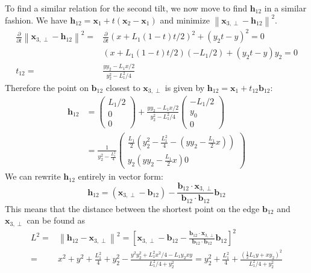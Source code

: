 \documentclass[10pt,a4paper]{article}
\newcommand{\half}[0]{\frac{1}{2}}
\newcommand{\bvec}[1]{\mathbf{#1}}
\begin{document}
To find a similar relation for the second tilt, we now move to find $\bvec{h}_{12}$ in a similar fashion.
We have $\bvec{h}_{12} = \bvec{x}_1 + t(\bvec{x}_2 - \bvec{x}_1)$ and minimize $\left\| \bvec{x}_{3,\perp} - \bvec{h}_{12} \right\|^2.$
\begin{align*}
  \frac{\partial}{\partial t}\left\| \bvec{x}_{3,\perp} - \bvec{h}_{12} \right\|^2 =& \frac{\partial}{\partial t}( x + L_1 (1-t)t / 2 )^2 + (y_2 t - y)^2 = 0  \\
                                                                                    &( x + L_1 (1-t)t / 2 )(-L_1/2) + (y_2 t - y)y_2 = 0 \\
  t_{12} =& \frac{ y y_2 - L_1x/2}{y_2^2 - L_1^2/4}
\end{align*}
Therefore the point on $\bvec{b}_{12}$ closest to $\bvec{x}_{3,\perp}$ is given by $\bvec{h}_{12} = \bvec{x}_1 + t_{12} \bvec{b}_{12}:$
\begin{align*}
  \bvec{h}_{12} &= \begin{pmatrix}
    L_1/2 \\
    0 \\
    0
  \end{pmatrix} + \frac{y y_2 - L_1 x / 2}{y_2^2 - L_1^2/4}\begin{pmatrix}
    -L_1/2\\
    y_0 \\
    0
  \end{pmatrix} \\
  &= \frac{1}{y_2^2 - \frac{L_1^2}{4} } \begin{pmatrix}
    \frac{L_1}{2}\left( y_2^2 - \frac{L_1^2}{4} - \left(y y_2 - \frac{L_1}{2}x\right) \right) \\
    y_2 \left( y y_2 - \frac{L_1}{2}x \right)
    0
  \end{pmatrix}
\end{align*}
We can rewrite $\bvec{h}_{12}$ entirely in vector form:
\begin{equation*}
  \bvec{h}_{12} = (\bvec{x}_{3,\perp} - \bvec{b}_{12}) - \frac{\bvec{b}_{12} \cdot \bvec{x}_{3,\perp}}{\bvec{b}_{12}\cdot \bvec{b}_{12}} \bvec{b}_{12} 
\end{equation*}
This means that the distance between the shortest point on the edge $\bvec{b}_{12}$ and $\bvec{x}_{3,\perp}$ can be found as
\begin{align*}
  L^2 =& \left\| \bvec{h}_{12} - \bvec{x}_{3,\perp} \right\|^2 = \left[ \bvec{x}_{3,\perp} - \bvec{b}_{12} - \frac{\bvec{b}_{12}\cdot \bvec{x}_{3,\perp}}{\bvec{b}_{12} \cdot \bvec{b}_{12}}\bvec{b}_{12} \right]^2 \\
  =& x^2 + y^2 + \frac{L_1^2}{4} + y_2^2 - \frac{y^2 y_2^2 + L_1^2x^2/4 - L_1y_2 x y}{L_1^2/4 + y_2^2} = y_2^2 + \frac{L_1^2}{4} + \frac{(\half L_1 y + x y_2)^2}{L_1^2/4 + y_2^2}
\end{align*}
\end{document}
